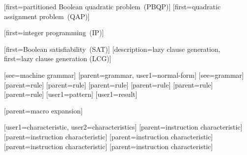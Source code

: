 [first={partitioned Boolean quadratic problem~(PBQP)}]
[first={quadratic assignment problem~(QAP)}]

[first={integer programming~(IP)}]

[first={Boolean satisfiability~(SAT)}]
[description={lazy clause generation},
              first={lazy clause generation (LCG)}]



[see={machine grammar}]
[parent={grammar}, user1={normal-form}]
[see={grammar}]
[parent={rule}]
[parent={rule}]
[parent={rule}]
[parent={rule}]
[parent={rule}]
[parent={rule}]
[user1={pattern}]
[user1={result}]






[parent={macro expansion}]

%
        [user1={characteristic}, user2={characteristics}]
%
        [parent={instruction characteristic}]
%
        [parent={instruction characteristic}]
%
        [parent={instruction characteristic}]
%
        [parent={instruction characteristic}]
%
        [parent={instruction characteristic}]

